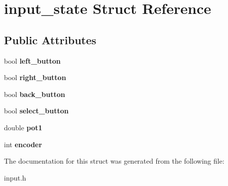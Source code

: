 \hypertarget{structinput__state}{}\section{input\+\_\+state Struct Reference}
\label{structinput__state}
\subsection*{Public Attributes}
\begin{DoxyCompactItemize}
\item 
\mbox{\label{structinput__state_aa7744c05d3de93a2ad80f782af6aa725}} 
bool {\bfseries left\+\_\+button}
\item 
\mbox{\label{structinput__state_acddaa9c1aaa4f8b0be8fe63ecdc076c4}} 
bool {\bfseries right\+\_\+button}
\item 
\mbox{\label{structinput__state_aee139fe56fd57f550747a7d95dfe4a38}} 
bool {\bfseries back\+\_\+button}
\item 
\mbox{\label{structinput__state_a2a04013f31ce0b90f963380de21c4833}} 
bool {\bfseries select\+\_\+button}
\item 
\mbox{\label{structinput__state_a72a330202344059d8302823e3ec7fb40}} 
double {\bfseries pot1}
\item 
\mbox{\label{structinput__state_a97cd9e7737cd52e70828932f0d9bdb6e}} 
int {\bfseries encoder}
\end{DoxyCompactItemize}


The documentation for this struct was generated from the following file\+:\begin{DoxyCompactItemize}
\item 
input.\+h\end{DoxyCompactItemize}

